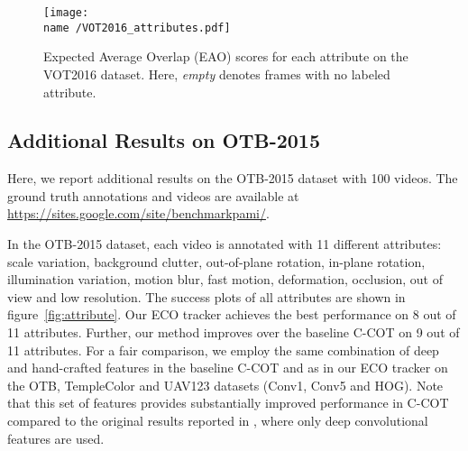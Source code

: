 \documentclass[10pt,twocolumn,letterpaper]{article}
\begin{document}
\begin{figure}[!t]
	\centering
	\newcommand{\wid}{\columnwidth}
	\newcommand{\name}{figures/sota_VOT}
	\texttt{[image: \\name /VOT2016\_attributes.pdf]}\caption{Expected Average Overlap (EAO) scores for each attribute on the VOT2016 dataset. Here, \emph{empty} denotes frames with no labeled attribute.}
	\label{fig:VOT_attribute}
\end{figure}

\subsection*{Additional Results on OTB-2015}
\label{sec:supp_OTB}
Here, we report additional results on the OTB-2015 dataset \cite{OTB2015} with 100 videos. The ground truth annotations and videos are available at \url{https://sites.google.com/site/benchmarkpami/}.

In the OTB-2015 dataset, each video is annotated with 11 different attributes: scale variation, background clutter, out-of-plane rotation, in-plane rotation, illumination variation, motion blur, fast motion, deformation, occlusion, out of view and low resolution. The success plots of all attributes are shown in figure~\ref{fig:attribute}. Our ECO tracker achieves the best performance on 8 out of 11 attributes. Further, our method improves over the baseline C-COT \cite{DanelljanECCV2016} on 9 out of 11 attributes. For a fair comparison, we employ the same combination of deep and hand-crafted features in the baseline C-COT and as in our ECO tracker on the OTB, TempleColor and UAV123 datasets (Conv1, Conv5 and HOG). Note that this set of features provides substantially improved performance in C-COT compared to the original results reported in \cite{DanelljanECCV2016}, where only deep convolutional features are used.
\end{document}
